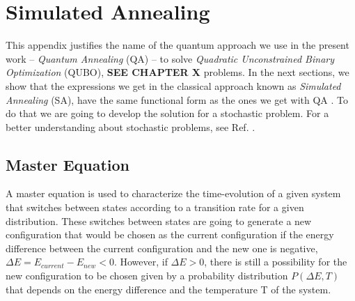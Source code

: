 
\chapter{Simulated Annealing} %

This appendix justifies the name of the quantum approach we use in the present work -- \textit{Quantum Annealing} (QA) -- to solve \textit{Quadratic Unconstrained Binary Optimization} (QUBO), \textbf{SEE CHAPTER X} problems. In the next sections, we show that the expressions we get in the classical approach known as \textit{Simulated Annealing} (SA), have the same functional form as the ones we get with QA \cite{Kadowaki1998QuantumModel}. To do that we are going to develop the solution for a stochastic problem. For a better understanding about stochastic problems, see Ref. \cite{Schneider2006StochasticOptimization}. 
\label{AppendixB} %
\section{Master Equation}
A master equation is used to characterize the time-evolution of a given system that switches between states according to a transition rate for a given distribution. These switches between states are going to generate a new configuration that would be chosen as the current configuration if the energy difference between the current configuration and the new one is negative, $\Delta E = E_{current} - E_{new} < 0$. However, if $\Delta E > 0$, there is still a possibility for the new configuration to be chosen given by a probability distribution $P \left(\Delta E, T \right)$ that depends on the energy difference and the temperature T of the system.
